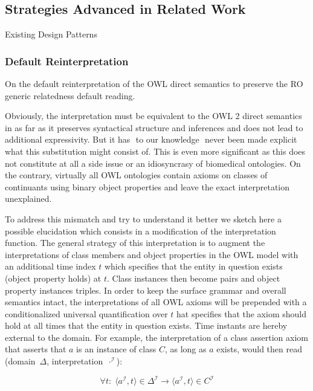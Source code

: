 \documentclass[10pt]{bmc_article}
\newcommand{\mclass}[1]{\ensuremath{\mathit{#1}}}
\newcommand{\dlint}[1]{\ensuremath{#1^{\mathcal{I}}}}
\newcommand{\pair}[2]{\ensuremath{\langle #1,#2\rangle}}
\newenvironment{bmcformat}{\baselineskip20pt\sloppy\setboolean{publ}{false}}{\baselineskip20pt\sloppy}
\begin{document}
\begin{bmcformat}
\subsection*{Strategies Advanced in Related Work}

Existing Design Patterns

\subsubsection*{Default Reinterpretation}

On the default reinterpretation of the OWL direct semantics to preserve the RO 
generic relatedness default reading. 

Obviously, the interpretation must be equivalent to the OWL 2 direct semantics
\cite{OWL2:direct} in as far as it preserves syntactical structure and inferences and does not
lead to additional expressivity. But it has  to our knowledge  never been made
explicit what this substitution might consist of.  This is even more significant
as this does not constitute at all a side issue or an idiosyncrasy of biomedical
ontologies. On the contrary, virtually all OWL ontologies contain axioms on
classes of continuants using binary object properties and leave the exact
interpretation unexplained. 

To address this mismatch and try to understand it better we sketch here a
possible elucidation  which consists in a modification of the interpretation
function. The general strategy of this interpretation is to augment the
interpretations of class members and object properties in the OWL model with an
additional time index $t$ which specifies that the entity in question exists
(object property holds) at $t$. Class instances then become pairs and object
property instances triples. In order to keep the surface grammar and overall
semantics intact, the interpretations of all OWL axioms will be prepended with a
conditionalized universal quantification over $t$  hat specifies that the axiom
should hold at all times that the entity in question exists.  Time instants are
hereby external to the domain. For example, the interpretation of a class
assertion axiom that asserts that $a$ is an instance of class \mclass{C}, as long
as $a$ exists, would then read (domain~$\Delta$, interpretation~$\cdot^\mathcal{I}$):

\begin{equation}
\forall t:\;\pair{\dlint{a}}{t}\in \dlint{\Delta} \rightarrow
\pair{\dlint{a}}{t} \in \dlint{\mclass{C}}
\end{equation}


\end{bmcformat}
\end{document}
